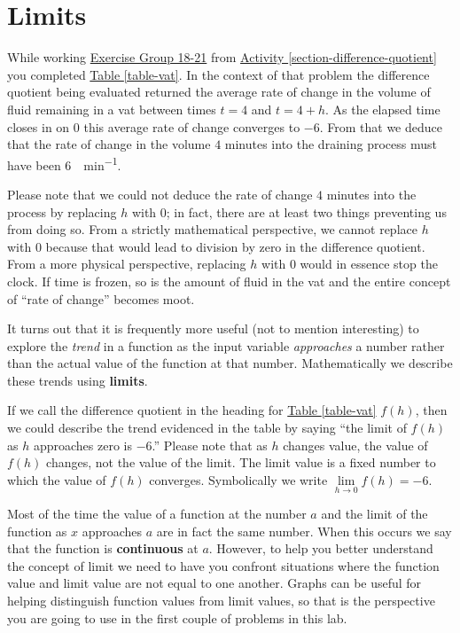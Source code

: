 \documentclass[12pt,]{book}
\newcommand{\terminology}[1]{\textbf{#1}}
\theoremstyle{plain}
\theoremstyle{definition}
\numberwithin{equation}{section}
\newcommand{\fe}[2]{#1\mathopen{}\left(#2\right)\mathclose{}}
\begin{document}
\section[Limits]{Limits}\label{section-limits}
While working \hyperlink{exercisegroup-vat}{Exercise Group 18-21} from \hyperref[section-difference-quotient]{Activity \ref{section-difference-quotient}} you completed \hyperref[table-vat]{Table \ref{table-vat}}. In the context of that problem the difference quotient being evaluated returned the average rate of change in the volume of fluid remaining in a vat between times \(t=4\) and \(t=4+h\). As the elapsed time closes in on \(0\) this average rate of change converges to \(-6\). From that we deduce that the rate of change in the volume \(4\) minutes into the draining process must have been \SI{6}{\gallon\per\minute}.%
\par
Please note that we could not deduce the rate of change \(4\) minutes into the process by replacing \(h\) with \(0\); in fact, there are at least two things preventing us from doing so. From a strictly mathematical perspective, we cannot replace \(h\) with \(0\) because that would lead to division by zero in the difference quotient. From a more physical perspective, replacing \(h\) with \(0\) would in essence stop the clock. If time is frozen, so is the amount of fluid in the vat and the entire concept of ``rate of change'' becomes moot.%
\par
It turns out that it is frequently more useful (not to mention interesting) to explore the \emph{trend} in a function as the input variable \emph{approaches} a number rather than the actual value of the function at that number. Mathematically we describe these trends using \terminology{limits}.%
\par
If we call the difference quotient in the heading for \hyperref[table-vat]{Table \ref{table-vat}} \(\fe{f}{h}\), then we could describe the trend evidenced in the table by saying ``the limit of \(\fe{f}{h}\) as \(h\) approaches zero is \(-6\).'' Please note that as \(h\) changes value, the value of \(\fe{f}{h}\) changes, not the value of the limit. The limit value is a fixed number to which the value of \(\fe{f}{h}\) converges. Symbolically we write \(\lim\limits_{h\to0}\fe{f}{h}=-6\).%
\par
Most of the time the value of a function at the number \(a\) and the limit of the function as \(x\) approaches \(a\) are in fact the same number. When this occurs we say that the function is \terminology{continuous} at \(a\). However, to help you better understand the concept of limit we need to have you confront situations where the function value and limit value are not equal to one another. Graphs can be useful for helping distinguish function values from limit values, so that is the perspective you are going to use in the first couple of problems in this lab.%
\typeout{************************************************}
\typeout{************************************************}
\end{document}
